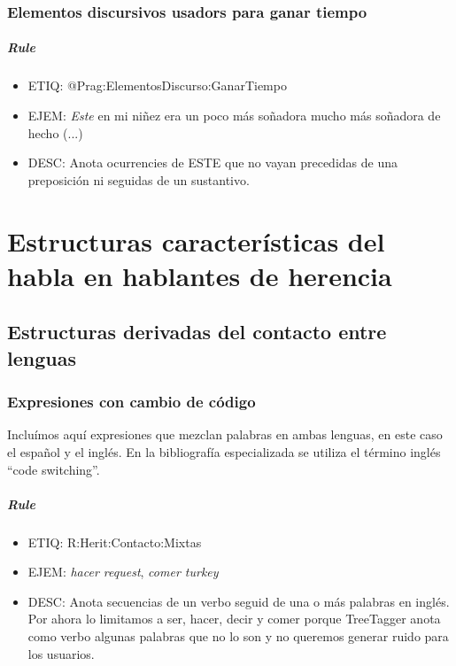 \documentclass[11pt]{report}
\begin{document}
\subsection{Elementos discursivos usadors para ganar tiempo}
\paragraph*{Rule}
\begin{itemize}
\item ETIQ: @Prag:ElementosDiscurso:GanarTiempo
\item EJEM: \emph{Este} en mi niñez era un poco más soñadora mucho más soñadora de hecho (...)
\item DESC: Anota ocurrencies de ESTE que no vayan precedidas de una preposición ni seguidas de un sustantivo.
\end{itemize}

\chapter{Estructuras características del habla en hablantes de herencia}
\section{Estructuras derivadas del contacto entre lenguas}
\subsection{Expresiones con cambio de código}
Incluímos aquí expresiones que mezclan palabras en ambas lenguas, en este caso el español y el inglés. En la bibliografía especializada se utiliza el término inglés ``code switching''.

\paragraph*{Rule}
\begin{itemize}
\item ETIQ: R:Herit:Contacto:Mixtas
\item EJEM: \emph{hacer request}, \emph{comer turkey}
\item DESC: Anota secuencias de un verbo seguid de una o más palabras en inglés. Por ahora lo limitamos a ser, hacer, decir y comer porque TreeTagger anota como verbo algunas palabras que no lo son y no queremos generar ruido para los usuarios.
\end{itemize}
\end{document}
